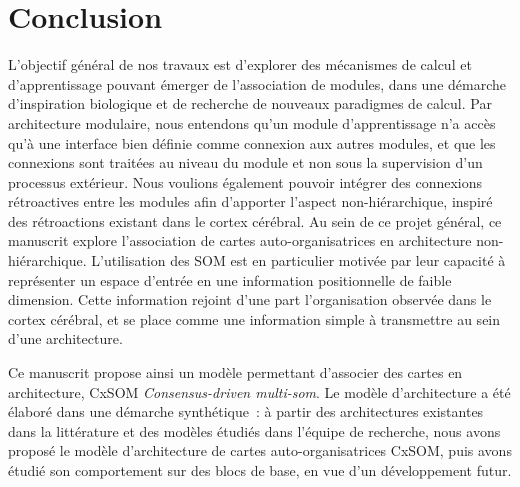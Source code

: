 \chapter*{Conclusion}



L'objectif général de nos travaux est d'explorer des mécanismes de calcul et d'apprentissage pouvant émerger de l'association de modules, dans une démarche d'inspiration biologique et de recherche de nouveaux paradigmes de calcul. 
Par architecture modulaire, nous entendons qu'un module d'apprentissage n'a accès qu'à une interface bien définie comme connexion aux autres modules, et que les connexions sont traitées au niveau du module et non sous la supervision d'un processus extérieur. Nous voulions également pouvoir intégrer des connexions rétroactives entre les modules afin d'apporter l'aspect non-hiérarchique, inspiré des rétroactions existant dans le cortex cérébral. 
Au sein de ce projet général, ce manuscrit explore l'association de cartes auto-organisatrices en architecture non-hiérarchique. L'utilisation des SOM est en particulier motivée par leur capacité à représenter un espace d'entrée en une information positionnelle de faible dimension. Cette information rejoint d'une part l'organisation observée dans le cortex cérébral, et se place comme une information simple à transmettre au sein d'une architecture.

Ce manuscrit propose ainsi un modèle permettant d'associer des cartes en architecture, CxSOM \emph{Consensus-driven multi-som}. Le modèle d'architecture a été élaboré dans une démarche synthétique~: à partir des architectures existantes dans la littérature et des modèles étudiés dans l'équipe de recherche, nous avons proposé le modèle d'architecture de cartes auto-organisatrices CxSOM, puis avons étudié son comportement sur des blocs de base, en vue d'un développement futur.

